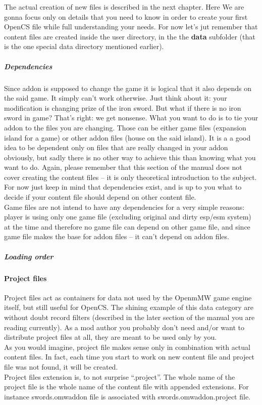 The actual creation of new files is described in the next chapter. Here We are gonna focus only on details that you need to know in order to create your first Open{CS} file while full understanding your needs. For now let's jut remember that content files are created inside the user directory, in the the \textbf{data} subfolder (that is the one special data directory mentioned earlier).\\

\subparagraph{Dependencies}
Since addon is supposed to change the game it is logical that it also depends on the said game. It simply can't work otherwise. Just think about it: your modification is changing prize of the iron sword. But what if there is no iron sword in game? That's right: we get nonsense. What you want to do is to tie your addon to the files you are changing. Those can be either game files (expansion island for a game) or other addon files (house on the said island). It is a a good idea to be dependent only on files that are really changed in your addon obviously, but sadly there is no other way to achieve this than knowing what you want to do. Again, please remember that this section of the manual does not cover creating the content files -- it is only theoretical introduction to the subject. For now just keep in mind that dependencies exist, and is up to you what to decide if your content file should depend on other content file.\\

Game files are not intend to have any dependencies for a very simple reasons: player is using only one game file (excluding original and dirty esp/esm system) at the time and therefore no game file can depend on other game file, and since game file makes the base for addon files -- it can't depend on addon files.\\

\subparagraph{Loading order}

\paragraph{Project files}
Project files act as containers for data not used by the Openm{MW} game engine itself, but still useful for OpenCS. The shining example of this data category are without doubt record filters (described in the later section of the manual you are reading currently). As a mod author you probably don't need and/or want to distribute project files at all, they are meant to be used only by you.\\ 
As you would imagine, project file makes sense only in combination with actual content files. In fact, each time you start to work on new content file and project file was not found, it will be created.\\ 
Project files extension is, to not surprise ``.project''. The whole name of the project file is the whole name of the content file with appended extensions. For instance swords.omwaddon file is associated with swords.omwaddon.project file.\\

